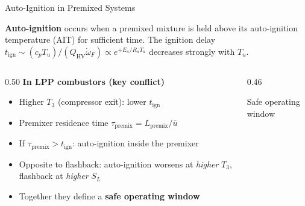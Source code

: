 \documentclass[12pt,aspectratio=169]{beamer}
\newcommand{\wdot}{\dot{\omega}}
\newcommand{\SL}{S_L}
\begin{document}
\begin{frame}{Auto-Ignition in Premixed Systems}

  \textbf{Auto-ignition} occurs when a premixed mixture is held above its
  auto-ignition temperature (AIT) for sufficient time.
  The ignition delay $t_{\text{ign}} \sim (c_p T_u)/(Q_{\text{HV}}\wdot_F) \propto e^{+E_a/R_u T_u}$
  decreases strongly with $T_u$.

  \begin{columns}[t]
    \begin{column}{0.50\textwidth}
      \textbf{In LPP combustors (key conflict)}
      \begin{itemize}
        \item Higher $T_3$ (compressor exit): lower $t_{\text{ign}}$
        \item Premixer residence time $\tau_{\text{premix}} =
              L_{\text{premix}}/\bar{u}$
        \item If $\tau_{\text{premix}} > t_{\text{ign}}$:
              auto-ignition inside the premixer
        \item Opposite to flashback: auto-ignition worsens
              at \emph{higher} $T_3$, flashback at \emph{higher} $\SL$
        \item Together they define a \textbf{safe operating window}
      \end{itemize}
    \end{column}
    \begin{column}{0.46\textwidth}
      \begin{alertblock}{Safe operating window}
        \centering
      \end{alertblock}
    \end{column}
  \end{columns}
\end{frame}
\end{document}
